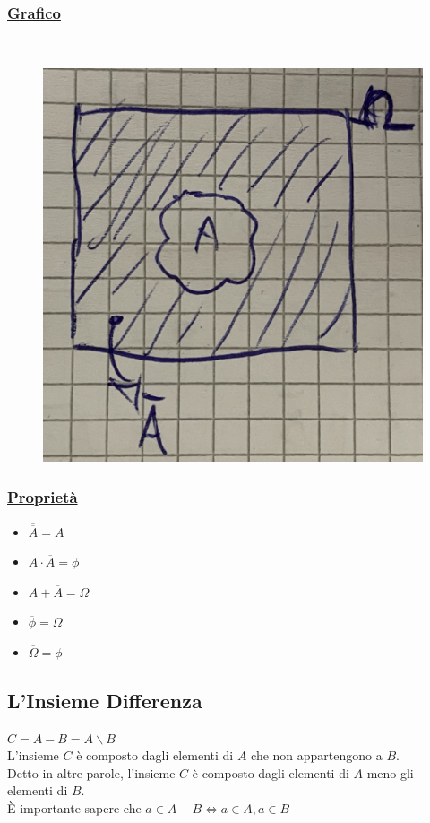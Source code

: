 \documentclass{article}
\begin{document}
\subsubsection{\underline{Grafico}} ~\\
\begin{figure}[ht]
\centering
\includegraphics[scale=0.13]{images/19.VennCompl.jpeg}
\end{figure} 
\subsubsection{\underline{Proprietà}}
\begin{itemize}
    \item $\overline{\overline{A}} = A$
    \item $A \cdot \overline{A} = \phi$
    \item $A + \overline{A} = \Omega$
    \item $\overline{\phi} = \Omega$
    \item $\overline{\Omega} = \phi$
\end{itemize}

\subsection{L’Insieme Differenza}
$C = A-B = A \backslash B$ \\
L’insieme $C$ è composto dagli elementi di $A$ che non appartengono a $B$. \\
Detto in altre parole, l’insieme $C$ è composto dagli elementi di $A$ meno gli elementi di $B$. \\
È importante sapere che $a \in A-B \iff a \in A, a \in B$
\end{document}
